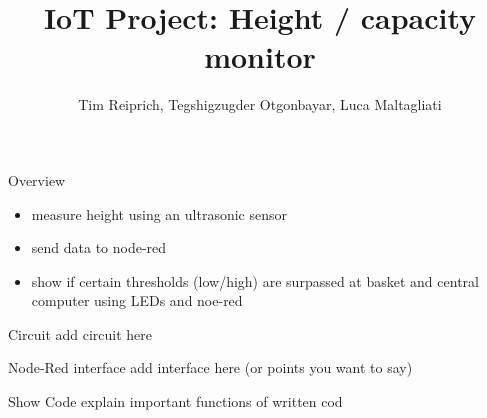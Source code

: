 \documentclass[11pt]{beamer}
\author{Tim Reiprich, Tegshigzugder Otgonbayar, Luca Maltagliati}
\title{IoT Project: Height / capacity monitor}
\begin{document}
\begin{frame}
\titlepage
\end{frame}


\begin{frame}{Overview}
\begin{itemize}
\item measure height using an ultrasonic sensor
\item send data to node-red
\item show if certain thresholds (low/high) are surpassed at basket and central computer using LEDs and noe-red
\end{itemize}
\end{frame}

\begin{frame}{Circuit}
add circuit here
\end{frame}

\begin{frame}{Node-Red interface}
add interface here (or points you want to say)
\end{frame}

\begin{frame}{Show Code}
explain important functions of written cod
\end{frame}
\end{document}
